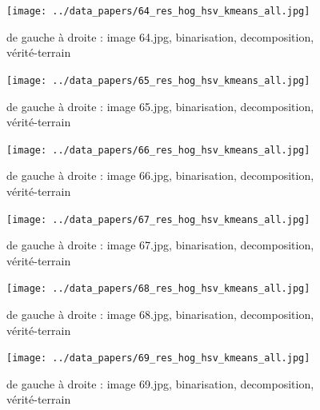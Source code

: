 \documentclass{book}
\begin{document}
\begin{figure}[H]
\begin{center}
\texttt{[image: ../data\_papers/64\_res\_hog\_hsv\_kmeans\_all.jpg]}
\end{center}
\caption{de gauche à droite : image 64.jpg, binarisation, decomposition, vérité-terrain}
\label{64}
\end{figure}
\clearpage


\begin{figure}[H]
\begin{center}
\texttt{[image: ../data\_papers/65\_res\_hog\_hsv\_kmeans\_all.jpg]}
\end{center}
\caption{de gauche à droite : image 65.jpg, binarisation, decomposition, vérité-terrain}
\label{65}
\end{figure}
\clearpage


\begin{figure}[H]
\begin{center}
\texttt{[image: ../data\_papers/66\_res\_hog\_hsv\_kmeans\_all.jpg]}
\end{center}
\caption{de gauche à droite : image 66.jpg, binarisation, decomposition, vérité-terrain}
\label{66}
\end{figure}
\clearpage


\begin{figure}[H]
\begin{center}
\texttt{[image: ../data\_papers/67\_res\_hog\_hsv\_kmeans\_all.jpg]}
\end{center}
\caption{de gauche à droite : image 67.jpg, binarisation, decomposition, vérité-terrain}
\label{67}
\end{figure}
\clearpage


\begin{figure}[H]
\begin{center}
\texttt{[image: ../data\_papers/68\_res\_hog\_hsv\_kmeans\_all.jpg]}
\end{center}
\caption{de gauche à droite : image 68.jpg, binarisation, decomposition, vérité-terrain}
\label{68}
\end{figure}
\clearpage


\begin{figure}[H]
\begin{center}
\texttt{[image: ../data\_papers/69\_res\_hog\_hsv\_kmeans\_all.jpg]}
\end{center}
\caption{de gauche à droite : image 69.jpg, binarisation, decomposition, vérité-terrain}
\label{69}
\end{figure}
\clearpage
\end{document}

